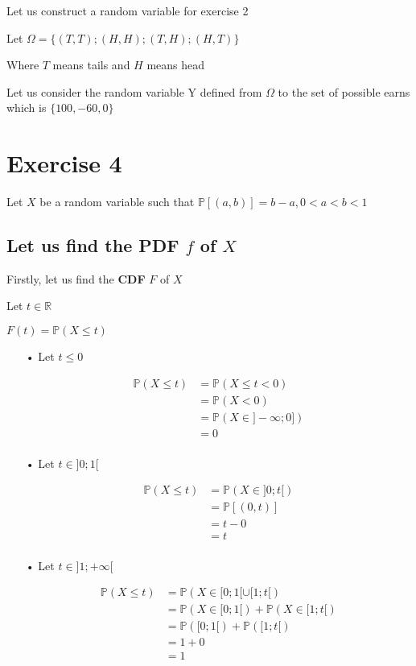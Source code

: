 \documentclass[11pt]{article}
\def\lt{<}
\begin{document}
    Let us construct a random variable for exercise 2
    
    Let $\Omega=\{(T,T);(H,H); (T,H); (H,T)\}$

Where $T$ means tails and $H$ means head

Let us consider the random variable Y defined from $\Omega$ to the set of possible earns which is $\{100,-60,0\}$
    
\newpage 
    \section{Exercise 4}
    
    Let $X$ be a random variable such that
    $ \mathbb{P}[(a, b)] = b - a, 0 \lt a \lt b \lt 1$
    
    \subsection{Let us find the PDF $f$ of $X$}
    
    Firstly, let us find the \textbf{CDF}  $F$ of $X$
    
    Let $t \in \mathbb{R}$
    
    $F(t)=\mathbb{P}(X\le t)$
    \begin{itemize}
    \item[•] Let $t\le 0$
    
    \begin{align*}
\mathbb{P}(X\le t) &=\mathbb{P}(X\le t \lt 0)\\
       &=\mathbb{P}(X\lt 0)\\
       &=\mathbb{P}(X\in ]-\infty ;0])\\
       &=0\\
\end{align*}

\item[•] Let $t\in ]0;1[$
    
    \begin{align*}
\mathbb{P}(X\le t)
       &=\mathbb{P}(X\in ]0 ;t[)\\
       &=\mathbb{P}[(0 ,t)]\\
       &=t-0\\
       &=t\\
\end{align*}

\item[•] Let $t\in ]1; +\infty[$ 
    
    \begin{align*}
\mathbb{P}(X\le t)
       &=\mathbb{P}(X\in [0 ;1[\cup [1;t[)\\
       &=\mathbb{P}(X\in [0 ;1[)+\mathbb{P}(X\in [1;t[)\\
       &=\mathbb{P}([0 ;1[)+\mathbb{P}([1;t[)\\
       &=1+0\\
       &=1\\
\end{align*} 

    \end{itemize}
    
\end{document}
